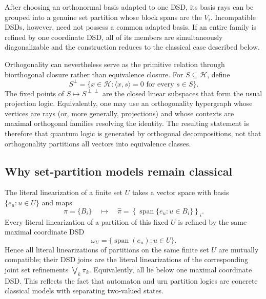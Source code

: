 \documentclass[aps,pra,reprint,nofootinbib]{revtex4-2}
\newcommand{\Span}{\operatorname{span}}
\begin{document}
After choosing an orthonormal basis adapted to one DSD, its basis rays can be
grouped into a genuine set partition whose block spans are the $V_i$.
Incompatible DSDs, however, need not possess a common adapted basis.  If an
entire family is refined by one coordinate DSD, all of its members are
simultaneously diagonalizable and the construction reduces to the classical
case described below.

Orthogonality can nevertheless serve as the primitive relation through
biorthogonal closure rather than equivalence closure.  For $S\subseteq
\mathcal H$, define
\begin{equation}
  S^\perp=\{x\in\mathcal H:\langle x,s\rangle=0
  \text{ for every }s\in S\}.
  \label{eq:orthogonal-complement-set}
\end{equation}
The fixed points of $S\mapsto S^{\perp\perp}$ are the closed linear
subspaces that form the usual projection logic.  Equivalently, one may use an
orthogonality hypergraph whose vertices are rays (or, more generally,
projections) and whose contexts are maximal orthogonal families resolving the
identity.  The resulting statement is therefore that quantum logic is
generated by orthogonal decompositions, not that orthogonality partitions all
vectors into equivalence classes.

\subsection{Why set-partition models remain classical}

The literal linearization of a finite set $U$ takes a vector space with basis
$\{e_u:u\in U\}$ and maps
\begin{equation}
  \pi=\{B_i\}
  \quad\longmapsto\quad
  \widehat\pi=
  \left\{\Span\{e_u:u\in B_i\}\right\}_i.
  \label{eq:literal-linearization}
\end{equation}
Every literal linearization of a partition of this fixed $U$ is refined by the
same maximal coordinate DSD
\begin{equation}
  \omega_U=\{\Span(e_u):u\in U\}.
\end{equation}
Hence all literal linearizations of partitions on the same finite set $U$ are
mutually compatible; their DSD joins are the literal linearizations of the
corresponding joint set refinements $\bigvee_k\pi_k$.  Equivalently, all lie
below one maximal coordinate DSD.  This reflects the fact that automaton and
urn partition logics are concrete classical models with separating two-valued
states.
\end{document}
